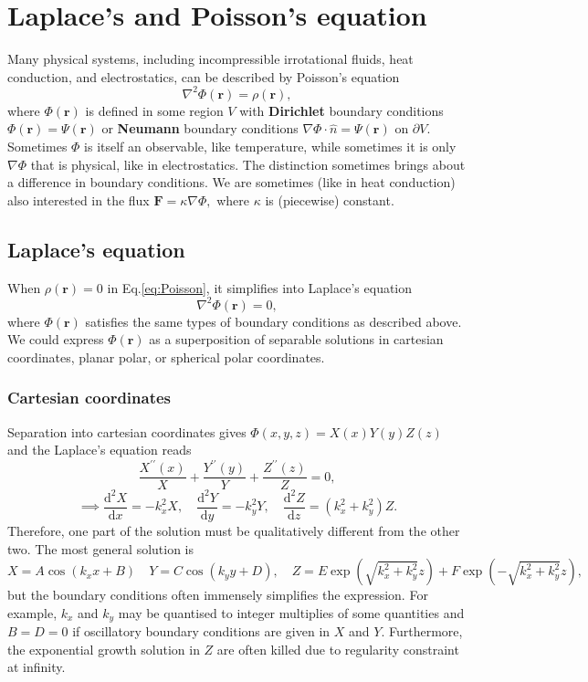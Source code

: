 \documentclass{article}
\begin{document}
\section{Laplace's and Poisson's equation}
Many physical systems, including incompressible irrotational fluids, heat conduction, and electrostatics, can be described by Poisson's equation 
\begin{equation}
    \nabla^{2} \Phi(\mathbf{r}) = \rho(\mathbf{r}), 
    \label{eq:Poisson}
\end{equation}
where $\Phi(\mathbf{r})$ is defined in some region $V$ with \textbf{Dirichlet} boundary conditions $\Phi(\mathbf{r} ) = \Psi(\mathbf{r})$ or \textbf{Neumann} boundary conditions $\nabla \Phi \cdot \hat{n} = \Psi(\mathbf{r} )$ on $\partial V.$ Sometimes $\Phi$ is itself an observable, like temperature, while sometimes it is only $\nabla \Phi$ that is physical, like in electrostatics. The distinction sometimes brings about a difference in boundary conditions. We are sometimes (like in heat conduction) also interested in the flux $\mathbf{F} = \kappa \nabla \Phi,$ where $\kappa$ is (piecewise) constant. 

\subsection{Laplace's equation}
When $\rho(\mathbf{r}) = 0$ in Eq.\eqref{eq:Poisson}, it simplifies into Laplace's equation 
\[
    \nabla^{2} \Phi(\mathbf{r} ) = 0,
\]
where $\Phi(\mathbf{r})$ satisfies the same types of boundary conditions as described above. We could express $\Phi (\mathbf{r} )$ as a superposition of separable solutions in cartesian coordinates, planar polar, or spherical polar coordinates. 

\subsubsection{Cartesian coordinates}
Separation into cartesian coordinates gives $\Phi(x,y,z) = X(x)Y(y)Z(z)$ and the Laplace's equation reads 
\[
    \frac{X^{\prime\prime} (x)}{X} + \frac{Y^{\prime\prime} (y)}{Y} + \frac{Z^{\prime\prime} (z)}{Z} = 0, 
\] 
\[
    \implies \frac{\mathrm{d}^{2} X}{\mathrm{d}x} = - k_x ^{2}  X, \quad 
    \frac{\mathrm{d}^{2} Y}{\mathrm{d}y} = -k_y ^{2} Y, \quad 
    \frac{\mathrm{d}^{2} Z}{\mathrm{d}z} = (k_x ^{2} + k_y ^{2} ) Z. 
\]
Therefore, one part of the solution must be qualitatively different from the other two. The most general solution is 
\[
    X = A \cos(k_x x + B) \quad 
    Y = C \cos(k_y y + D), \quad
    Z = E \exp(\sqrt{k_x ^{2}  + k_y ^{2} }z ) + F \exp(-\sqrt{k_x ^{2}  + k_y ^{2} }z ),
\]
but the boundary conditions often immensely simplifies the expression. For example, $k_x$ and $k_y$ may be quantised to integer multiplies of some quantities and $B=D=0$ if oscillatory boundary conditions are given in $X$ and $Y.$ Furthermore, the exponential growth solution in $Z$ are often killed due to regularity constraint at infinity.
\end{document}
